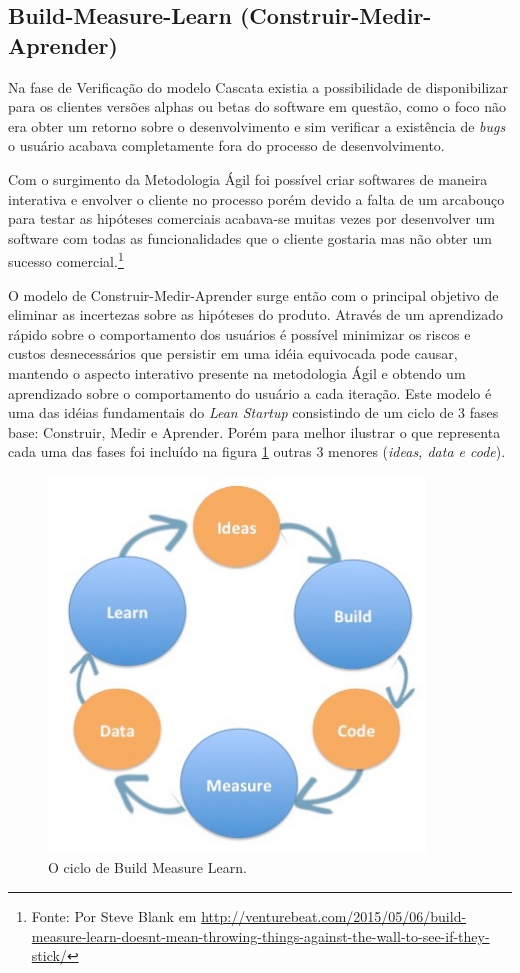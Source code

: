\subsection{Build-Measure-Learn (Construir-Medir-Aprender)}
\par Na fase de Verificação do modelo Cascata existia a possibilidade de disponibilizar para os clientes versões alphas ou betas do software em questão, como o foco não era obter um retorno sobre o desenvolvimento e sim verificar a existência de \emph{bugs} o usuário acabava completamente fora do processo de desenvolvimento.
\par Com o surgimento da Metodologia Ágil foi possível criar softwares de maneira interativa e envolver o cliente no processo porém devido a falta de um arcabouço para testar as hipóteses comerciais acabava-se muitas vezes por desenvolver um software com todas as funcionalidades que o cliente gostaria mas não obter um sucesso comercial.\footnote{Fonte: Por Steve Blank em \url{http://venturebeat.com/2015/05/06/build-measure-learn-doesnt-mean-throwing-things-against-the-wall-to-see-if-they-stick/}}
\par O modelo de Construir-Medir-Aprender surge então com o principal objetivo de eliminar as incertezas sobre as hipóteses do produto. Através de um aprendizado rápido sobre o comportamento dos usuários é possível minimizar os riscos e custos desnecessários que persistir em uma idéia equivocada pode causar, mantendo o aspecto interativo presente na metodologia Ágil e obtendo um aprendizado sobre o comportamento do usuário a cada iteração. Este modelo é uma das idéias fundamentais do \emph{Lean Startup} consistindo de um ciclo de 3 fases base: Construir, Medir e Aprender. Porém para melhor ilustrar o que representa cada uma das fases foi incluído na figura \ref{fig:buildmeasurelearn} outras 3 menores (\emph{ideas, data e code}).
\begin{figure}[htb]
\centering
\includegraphics[width=10cm]{figuras/buildmeasurelearn}
\caption{\label{fig:buildmeasurelearn}O ciclo de Build Measure Learn.}
\end{figure}
